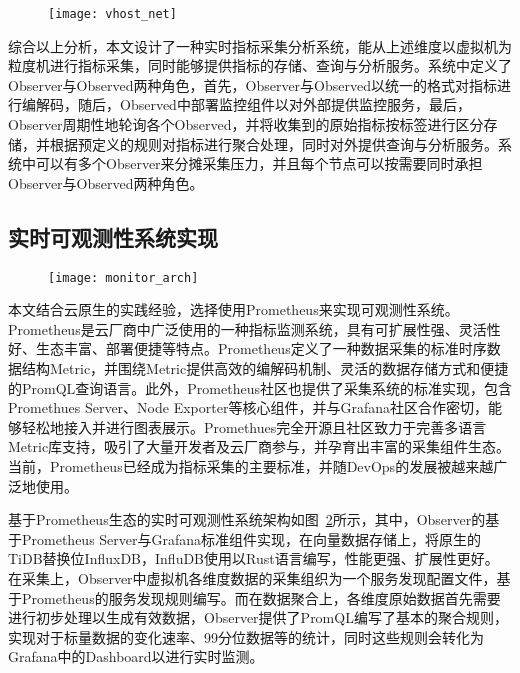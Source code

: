 \begin{figure}[!htbp]
    \centering
    \texttt{[image: vhost\_net]}
    \label{fig:vhost_net}
\end{figure}

综合以上分析，本文设计了一种实时指标采集分析系统，能从上述维度以虚拟机为粒度机进行指标采集，同时能够提供指标的存储、查询与分析服务。系统中定义了Observer与Observed两种角色，首先，Observer与Observed以统一的格式对指标进行编解码，随后，Observed中部署监控组件以对外部提供监控服务，最后，Observer周期性地轮询各个Observed，并将收集到的原始指标按标签进行区分存储，并根据预定义的规则对指标进行聚合处理，同时对外提供查询与分析服务。系统中可以有多个Observer来分摊采集压力，并且每个节点可以按需要同时承担Observer与Observed两种角色。

\subsection{实时可观测性系统实现}


\begin{figure}[!htbp]
    \centering
    \texttt{[image: monitor\_arch]}
    \label{fig:monitor_arch}
\end{figure}

本文结合云原生的实践经验，选择使用Prometheus来实现可观测性系统。Prometheus\citep{prometheus}是云厂商中广泛使用的一种指标监测系统，具有可扩展性强、灵活性好、生态丰富、部署便捷等特点。Prometheus定义了一种数据采集的标准时序数据结构Metric，并围绕Metric提供高效的编解码机制、灵活的数据存储方式和便捷的PromQL查询语言。此外，Prometheus社区也提供了采集系统的标准实现，包含Promethues Server、Node Exporter等核心组件，并与Grafana社区合作密切，能够轻松地接入并进行图表展示。Promethues完全开源且社区致力于完善多语言Metric库支持，吸引了大量开发者及云厂商参与，并孕育出丰富的采集组件生态。当前，Prometheus已经成为指标采集的主要标准，并随DevOps的发展被越来越广泛地使用。

基于Prometheus生态的实时可观测性系统架构如图~\ref{fig:monitor_arch}所示，其中，Observer的基于Prometheus Server与Grafana标准组件实现，在向量数据存储上，将原生的TiDB替换位InfluxDB，InfluDB使用以Rust语言编写，性能更强、扩展性更好。在采集上，Observer中虚拟机各维度数据的采集组织为一个服务发现配置文件，基于Prometheus的服务发现规则编写。而在数据聚合上，各维度原始数据首先需要进行初步处理以生成有效数据，Observer提供了PromQL编写了基本的聚合规则，实现对于标量数据的变化速率、99分位数据等的统计，同时这些规则会转化为Grafana中的Dashboard以进行实时监测。

